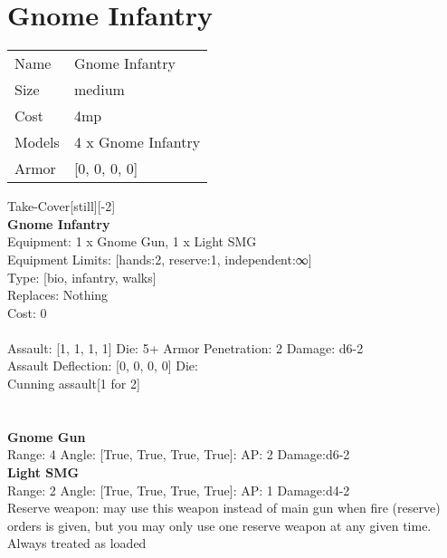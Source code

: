 \pagebreak

\section{ Gnome Infantry }

\begin{tabular}{ll}
  Name & Gnome Infantry \\
  Size & medium\\
  Cost & 4mp\\
  Models & 4 x Gnome Infantry\\
  Armor & [0, 0, 0, 0]\\
\end{tabular}

\noindent Take-Cover[still][-2]\\ 


{\bf Gnome Infantry } \\
Equipment: 1 x Gnome Gun, 1 x Light SMG \\
Equipment Limits: [hands:2, reserve:1, independent:∞] \\
Type: [bio, infantry, walks] \\
Replaces: Nothing \\
Cost: 0\\
\ \\
Assault: [1, 1, 1, 1] Die: 5+ Armor Penetration: 2 Damage: d6-2 \\
Assault Deflection: [0, 0, 0, 0] Die: \\
\indent Cunning assault[1 for 2]\\ 
 
\ \\

\ \\
{\bf Gnome Gun } \\



Range: 4  Angle: [True, True, True, True]: AP: 2 Damage:d6-2 \\




{\bf Light SMG } \\



Range: 2  Angle: [True, True, True, True]: AP: 1 Damage:d4-2 \\
Reserve weapon: may use this weapon instead of main gun when fire (reserve) orders is given, but you may only use one reserve weapon at any given time.\\ 
Always treated as loaded\\ 




